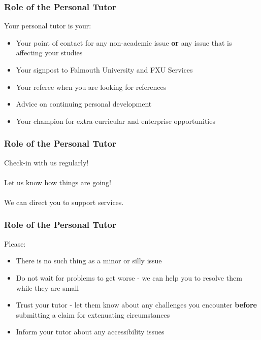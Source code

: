 \begin{frame}
	\frametitle{Role of the Personal Tutor}	
	
	Your personal tutor is your:
	
	\begin{itemize}
		\item Your point of contact for any non-academic issue \textbf{or} any issue that is affecting your studies
		\item Your signpost to Falmouth University and FXU Services
		\item Your referee when you are looking for references
		\item Advice on continuing personal development
		\item Your champion for extra-curricular and enterprise opportunities 
	\end{itemize}
\end{frame}

\begin{frame}
	\frametitle{Role of the Personal Tutor}	
	
	\begin{center}
		Check-in with us regularly!
		\\~\\
		Let us know how things are going!
		\\~\\
		We can direct you to support services.
	\end{center}
\end{frame}

\begin{frame}
	\frametitle{Role of the Personal Tutor}	
	
	Please:
	
	\begin{itemize}
		\item There is no such thing as a minor or silly issue
		\item Do not wait for problems to get worse - we can help you to resolve them while they are small
		\item Trust your tutor - let them know about any challenges you encounter
		         \textbf{before} submitting a claim for extenuating circumstances
		\item Inform your tutor about any accessibility issues
	\end{itemize}
\end{frame}

